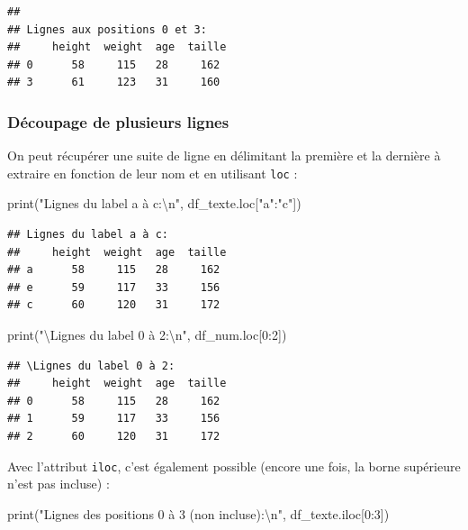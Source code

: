 \documentclass[12pt,]{book}
\newenvironment{Shaded}{\begin{snugshade}}{\end{snugshade}}
\newcommand{\DecValTok}[1]{\textcolor[rgb]{0.00,0.00,0.81}{#1}}
\newcommand{\CharTok}[1]{\textcolor[rgb]{0.31,0.60,0.02}{#1}}
\newcommand{\StringTok}[1]{\textcolor[rgb]{0.31,0.60,0.02}{#1}}
\newcommand{\BuiltInTok}[1]{#1}
\newcommand{\NormalTok}[1]{#1}
\numberwithin{equation}{section}
\numberwithin{countremarque}{section}
\begin{document}
\begin{lstlisting}
## 
## Lignes aux positions 0 et 3:
##     height  weight  age  taille
## 0      58     115   28     162
## 3      61     123   31     160
\end{lstlisting}

\subsubsection{Découpage de plusieurs lignes}\label{decoupage-df-lignes}

On peut récupérer une suite de ligne en délimitant la première et la
dernière à extraire en fonction de leur nom et en utilisant \texttt{loc}
:

\begin{Shaded}
\begin{Highlighting}[]
\BuiltInTok{print}\NormalTok{(}\StringTok{"Lignes du label a à c:}\CharTok{\textbackslash{}n}\StringTok{"}\NormalTok{, df_texte.loc[}\StringTok{"a"}\NormalTok{:}\StringTok{"c"}\NormalTok{])}
\end{Highlighting}
\end{Shaded}

\begin{lstlisting}
## Lignes du label a à c:
##     height  weight  age  taille
## a      58     115   28     162
## e      59     117   33     156
## c      60     120   31     172
\end{lstlisting}

\begin{Shaded}
\begin{Highlighting}[]
\BuiltInTok{print}\NormalTok{(}\StringTok{"\textbackslash{}Lignes du label 0 à 2:}\CharTok{\textbackslash{}n}\StringTok{"}\NormalTok{, df_num.loc[}\DecValTok{0}\NormalTok{:}\DecValTok{2}\NormalTok{])}
\end{Highlighting}
\end{Shaded}

\begin{lstlisting}
## \Lignes du label 0 à 2:
##     height  weight  age  taille
## 0      58     115   28     162
## 1      59     117   33     156
## 2      60     120   31     172
\end{lstlisting}

Avec l'attribut \texttt{iloc}, c'est également possible (encore une
fois, la borne supérieure n'est pas incluse) :

\begin{Shaded}
\begin{Highlighting}[]
\BuiltInTok{print}\NormalTok{(}\StringTok{"Lignes des positions 0 à 3 (non incluse):}\CharTok{\textbackslash{}n}\StringTok{"}\NormalTok{, df_texte.iloc[}\DecValTok{0}\NormalTok{:}\DecValTok{3}\NormalTok{])}
\end{Highlighting}
\end{Shaded}
\end{document}
